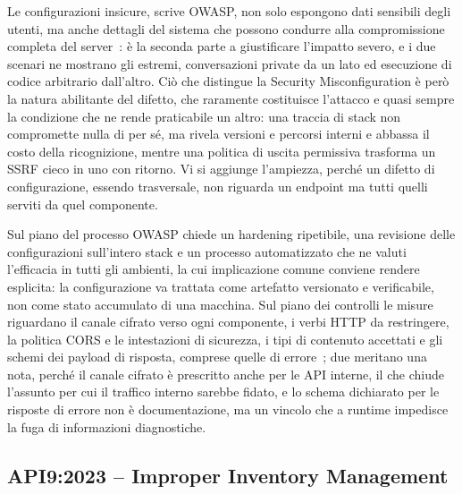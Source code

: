 Le configurazioni insicure, scrive OWASP, non solo espongono dati sensibili
degli utenti, ma anche dettagli del sistema che possono condurre alla
compromissione completa del server~\cite{owasp2023api8}: è la seconda parte a
giustificare l'impatto severo, e i due scenari ne mostrano gli estremi,
conversazioni private da un lato ed esecuzione di codice arbitrario dall'altro.
Ciò che distingue la Security Misconfiguration è però la natura abilitante del difetto, che raramente
costituisce l'attacco e quasi sempre la condizione che ne rende praticabile un
altro: una traccia di stack non compromette nulla di per sé, ma rivela versioni
e percorsi interni e abbassa il costo della ricognizione, mentre una politica
di uscita permissiva trasforma un SSRF cieco in uno con ritorno. Vi si aggiunge
l'ampiezza, perché un difetto di configurazione, essendo trasversale, non
riguarda un endpoint ma tutti quelli serviti da quel componente.

Sul piano del processo OWASP chiede un hardening ripetibile, una revisione
delle configurazioni sull'intero stack e un processo automatizzato che ne
valuti l'efficacia in tutti gli ambienti, la cui implicazione comune conviene
rendere esplicita: la configurazione va trattata come artefatto versionato e
verificabile, non come stato accumulato di una macchina. Sul piano dei
controlli le misure riguardano il canale cifrato verso ogni componente, i verbi
HTTP da restringere, la politica CORS e le intestazioni di sicurezza, i tipi di
contenuto accettati e gli schemi dei payload di risposta, comprese quelle di
errore~\cite{owasp2023api8}; due meritano una nota, perché il canale cifrato è
prescritto anche per le API interne, il che chiude l'assunto per cui il
traffico interno sarebbe fidato, e lo schema dichiarato per le risposte di
errore non è documentazione, ma un vincolo che a runtime impedisce la fuga di
informazioni diagnostiche.

\subsection{API9:2023 -- Improper Inventory Management}
\label{subsubsec:api9}

